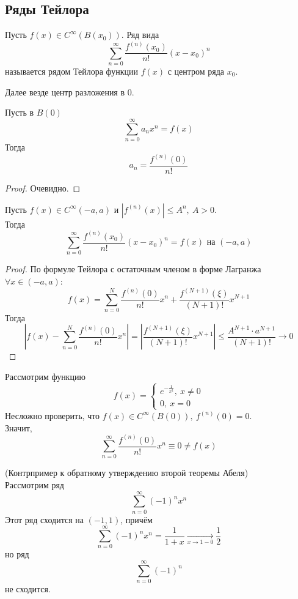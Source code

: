 \subsection{Ряды Тейлора}
\begin{definition}
    Пусть $f(x) \in C^\infty(B(x_0))$. Ряд вида
    \[\sum_{n=0}^{\infty}\frac{f^{(n)}(x_0)}{n!}(x-x_0)^n\]
    называется рядом Тейлора функции $f(x)$ с центром ряда $x_0$.
\end{definition}
\begin{comm}
    Далее везде центр разложения в 0.
\end{comm}
\begin{theorem}
    Пусть в $B(0)$
    \[\sum_{n=0}^{\infty}a_n x^n = f(x)\]
    Тогда
    \[a_n = \frac{f^{(n)}(0)}{n!}\]
\end{theorem}
\begin{proof}
    Очевидно.
\end{proof}
\begin{theorem}
    Пусть $f(x) \in C^\infty(-a, a)$ и $|f^{(n)}(x)| \leq A^n, \ A > 0$.\\
    Тогда
    \[\sum_{n=0}^{\infty}\frac{f^{(n)}(x_0)}{n!}(x-x_0)^n = f(x) \text{ на } (-a, a)\]
\end{theorem}
\begin{proof}
    По формуле Тейлора с остаточным членом в форме Лагранжа $\forall x \in (-a, a)$:
    \[f(x) = \sum_{n=0}^{N}\frac{f^{(n)}(0)}{n!}x^n + \frac{f^{(N+1)}(\xi)}{(N+1)!}x^{N+1}\]
    Тогда
    \[\left| f(x) - \sum_{n=0}^{N}\frac{f^{(n)}(0)}{n!}x^n \right| = \left| \frac{f^{(N+1)}(\xi)}{(N+1)!}x^{N+1}\right| \leq \frac{A^{N+1}\cdot a^{N+1}}{(N+1)!} \rightarrow 0\]
\end{proof}
\begin{example}
    Рассмотрим функцию 
    \[f(x) = \begin{cases}
        e^{-\frac{1}{x^2}}, \ x \neq 0\\
        0, \ x = 0
    \end{cases}\]
    Несложно проверить, что $f(x) \in C^\infty(B(0)),\ f^{(n)}(0) = 0$.\\
    Значит,
    \[\sum_{n=0}^{\infty}\frac{f^{(n)}(0)}{n!}x^n \equiv 0 \neq f(x)\] 
\end{example}
\begin{example} (Контрпример к обратному утверждению второй теоремы Абеля)\\
    Рассмотрим ряд
    \[\sum_{n=0}^{\infty}(-1)^n x^n\]
    Этот ряд сходится на $(-1, 1)$, причём
    \[\sum_{n=0}^{\infty}(-1)^n x^n = \frac{1}{1+x} \underset{x\rightarrow1-0}{\longrightarrow} \frac{1}{2}\]
    но ряд
    \[\sum_{n=0}^{\infty}(-1)^n\]
    не сходится.
\end{example}
